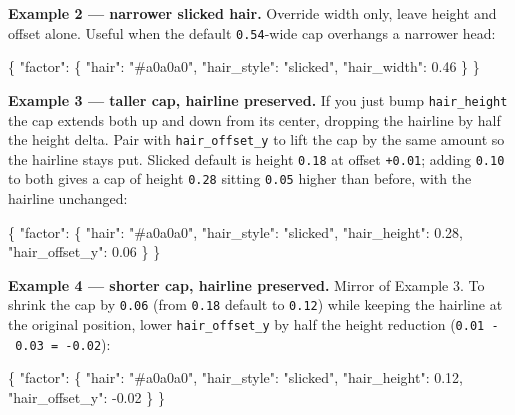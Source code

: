 \documentclass[
  12pt,
  letterpaper,
]{book}
\newenvironment{Shaded}{}{}
\newcommand{\DataTypeTok}[1]{\textcolor[rgb]{0.56,0.13,0.00}{#1}}
\newcommand{\FloatTok}[1]{\textcolor[rgb]{0.25,0.63,0.44}{#1}}
\newcommand{\FunctionTok}[1]{\textcolor[rgb]{0.02,0.16,0.49}{#1}}
\newcommand{\OtherTok}[1]{\textcolor[rgb]{0.00,0.44,0.13}{#1}}
\newcommand{\StringTok}[1]{\textcolor[rgb]{0.25,0.44,0.63}{#1}}
\begin{document}
\textbf{Example 2 --- narrower slicked hair.} Override width only, leave
height and offset alone. Useful when the default \texttt{0.54}-wide cap
overhangs a narrower head:

\begin{Shaded}
\begin{Highlighting}[]
\FunctionTok{\{}
  \DataTypeTok{"factor"}\FunctionTok{:} \FunctionTok{\{}
    \DataTypeTok{"hair"}\FunctionTok{:}        \StringTok{"\#a0a0a0"}\FunctionTok{,}
    \DataTypeTok{"hair\_style"}\FunctionTok{:}  \StringTok{"slicked"}\FunctionTok{,}
    \DataTypeTok{"hair\_width"}\FunctionTok{:}  \FloatTok{0.46}
  \FunctionTok{\}}
\FunctionTok{\}}
\end{Highlighting}
\end{Shaded}

\textbf{Example 3 --- taller cap, hairline preserved.} If you just bump
\texttt{hair\_height} the cap extends both up and down from its center,
dropping the hairline by half the height delta. Pair with
\texttt{hair\_offset\_y} to lift the cap by the same amount so the
hairline stays put. Slicked default is height \texttt{0.18} at offset
\texttt{+0.01}; adding \texttt{0.10} to both gives a cap of height
\texttt{0.28} sitting \texttt{0.05} higher than before, with the
hairline unchanged:

\begin{Shaded}
\begin{Highlighting}[]
\FunctionTok{\{}
  \DataTypeTok{"factor"}\FunctionTok{:} \FunctionTok{\{}
    \DataTypeTok{"hair"}\FunctionTok{:}           \StringTok{"\#a0a0a0"}\FunctionTok{,}
    \DataTypeTok{"hair\_style"}\FunctionTok{:}     \StringTok{"slicked"}\FunctionTok{,}
    \DataTypeTok{"hair\_height"}\FunctionTok{:}    \FloatTok{0.28}\FunctionTok{,}
    \DataTypeTok{"hair\_offset\_y"}\FunctionTok{:}  \FloatTok{0.06}
  \FunctionTok{\}}
\FunctionTok{\}}
\end{Highlighting}
\end{Shaded}

\textbf{Example 4 --- shorter cap, hairline preserved.} Mirror of
Example 3. To shrink the cap by \texttt{0.06} (from \texttt{0.18}
default to \texttt{0.12}) while keeping the hairline at the original
position, lower \texttt{hair\_offset\_y} by half the height reduction
(\texttt{0.01\ -\ 0.03\ =\ -0.02}):

\begin{Shaded}
\begin{Highlighting}[]
\FunctionTok{\{}
  \DataTypeTok{"factor"}\FunctionTok{:} \FunctionTok{\{}
    \DataTypeTok{"hair"}\FunctionTok{:}           \StringTok{"\#a0a0a0"}\FunctionTok{,}
    \DataTypeTok{"hair\_style"}\FunctionTok{:}     \StringTok{"slicked"}\FunctionTok{,}
    \DataTypeTok{"hair\_height"}\FunctionTok{:}    \FloatTok{0.12}\FunctionTok{,}
    \DataTypeTok{"hair\_offset\_y"}\FunctionTok{:} \OtherTok{-}\FloatTok{0.02}
  \FunctionTok{\}}
\FunctionTok{\}}
\end{Highlighting}
\end{Shaded}
\end{document}
